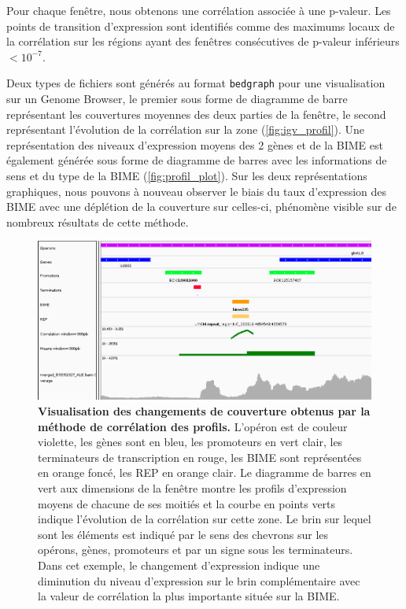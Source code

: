 \documentclass[12pt,a4paper]{report}
\begin{document}
\begin{onehalfspace}
Pour chaque fenêtre, nous obtenons une corrélation associée à une p-valeur. Les points de transition d’expression sont identifiés comme des maximums locaux de la corrélation sur les régions ayant des fenêtres consécutives de p-valeur  inférieurs $< 10^{-7}$.

Deux types de fichiers sont générés au format \texttt{bedgraph} pour une visualisation sur un Genome Browser, le premier sous forme de diagramme de barre représentant les couvertures moyennes des deux parties de la fenêtre, le second représentant l'évolution de la corrélation sur la zone (\autoref{fig:igv_profil}). Une représentation des niveaux d'expression moyens des 2 gènes et de la BIME est également générée sous forme de diagramme de barres avec les informations de sens et du type de la BIME (\autoref{fig:profil_plot}). Sur les deux représentations graphiques, nous pouvons à nouveau observer le biais du taux d'expression des BIME avec une déplétion de la couverture sur celles-ci, phénomène visible sur de nombreux résultats de cette méthode.

\begin{figure}[h!]
\centerline{\includegraphics[scale=0.53]{figures/igv_profil.png}}
\caption{\textbf{Visualisation des changements de couverture obtenus par la méthode de corrélation des profils.} L'opéron est de couleur violette, les gènes sont en bleu, les promoteurs en vert clair, les terminateurs de transcription en rouge, les BIME sont représentées en orange foncé, les REP en orange clair. Le diagramme de barres en vert aux dimensions de la fenêtre montre les profils d'expression moyens de chacune de ses moitiés et la courbe en points verts indique l'évolution de la corrélation sur cette zone. Le brin sur lequel sont les éléments est indiqué par le sens des chevrons sur les opérons, gènes, promoteurs et par un signe sous les terminateurs. Dans cet exemple, le changement d'expression indique une diminution du niveau d'expression sur le brin complémentaire avec la valeur de corrélation la plus importante située sur la BIME.}
\label{fig:igv_profil}
\end{figure}


\end{onehalfspace}
\end{document}
